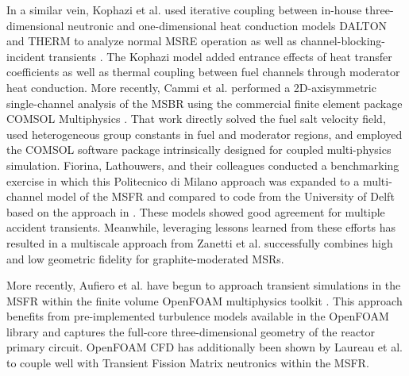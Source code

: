 \documentclass[answers,11pt]{exam}
\begin{document}
\begin{questions}
\begin{solution}
        In a similar vein, Kophazi et al. used iterative coupling between 
        in-house
        three-dimensional neutronic and one-dimensional heat conduction models 
        DALTON
        and THERM to analyze normal MSRE operation as well as
        channel-blocking-incident transients \cite{kophazi_development_2009}. 
        The
        Kophazi model added entrance effects of heat transfer coefficients as 
        well as
        thermal coupling between fuel channels through moderator heat 
        conduction. More
        recently, Cammi et al. performed a 2D-axisymmetric single-channel 
        analysis of
        the MSBR using the commercial finite element package COMSOL 
        Multiphysics
        \cite{cammi_multi-physics_2011}. That work directly solved the fuel 
        salt
        velocity field, used heterogeneous group constants in fuel and 
        moderator
        regions, and employed the COMSOL software package intrinsically 
        designed
        for coupled multi-physics simulation.  Fiorina, Lathouwers, and their
        colleagues conducted a benchmarking exercise 
        \cite{fiorina_modelling_2013} in
        which this Politecnico di Milano approach was expanded to a 
        multi-channel model 
        of the MSFR and compared to code from the University of Delft
        \cite{de_zwaan_static_2007,van_der_linden_2012} based on the approach 
        in
        \cite{kophazi_development_2009}. These models showed good agreement for
        multiple accident transients. Meanwhile, leveraging lessons learned 
        from these 
        efforts has resulted in a multiscale approach from Zanetti et al. 
        \cite{zanetti_geometric_2015} successfully combines high and low 
        geometric 
        fidelity for graphite-moderated MSRs.

        More recently, Aufiero et al. \cite{aufiero_development_2014} have 
        begun to
        approach transient simulations in the MSFR within the finite 
        volume
        OpenFOAM multiphysics toolkit \cite{weller_tensorial_1998}.  This 
        approach
        benefits from pre-implemented turbulence models available in the 
        OpenFOAM
        library and captures the full-core three-dimensional geometry of the 
        reactor
        primary circuit.  OpenFOAM CFD has additionally been shown by 
        Laureau et
        al. \cite{laureau_transient_2017} to couple well with Transient Fission 
        Matrix
        neutronics within the MSFR.
\end{solution}


\end{questions}
\end{document}
